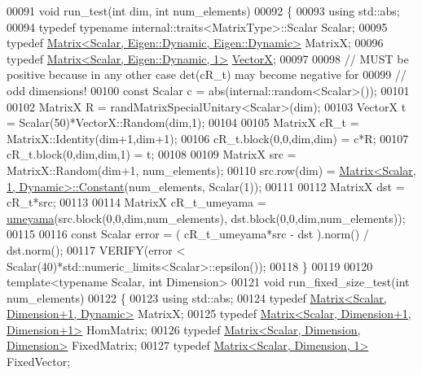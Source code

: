 \begin{DoxyCode}
00091 \textcolor{keywordtype}{void} run\_test(\textcolor{keywordtype}{int} dim, \textcolor{keywordtype}{int} num\_elements)
00092 \{
00093   \textcolor{keyword}{using} std::abs;
00094   \textcolor{keyword}{typedef} \textcolor{keyword}{typename} internal::traits<MatrixType>::Scalar Scalar;
00095   \textcolor{keyword}{typedef} \hyperlink{group___core___module_class_eigen_1_1_matrix}{Matrix<Scalar, Eigen::Dynamic, Eigen::Dynamic>} 
      MatrixX;
00096   \textcolor{keyword}{typedef} \hyperlink{group___core___module_class_eigen_1_1_matrix}{Matrix<Scalar, Eigen::Dynamic, 1>} 
      \hyperlink{group___core___module}{VectorX};
00097 
00098   \textcolor{comment}{// MUST be positive because in any other case det(cR\_t) may become negative for}
00099   \textcolor{comment}{// odd dimensions!}
00100   \textcolor{keyword}{const} Scalar c = abs(internal::random<Scalar>());
00101 
00102   MatrixX R = randMatrixSpecialUnitary<Scalar>(dim);
00103   VectorX t = Scalar(50)*VectorX::Random(dim,1);
00104 
00105   MatrixX cR\_t = MatrixX::Identity(dim+1,dim+1);
00106   cR\_t.block(0,0,dim,dim) = c*R;
00107   cR\_t.block(0,dim,dim,1) = t;
00108 
00109   MatrixX src = MatrixX::Random(dim+1, num\_elements);
00110   src.row(dim) = \hyperlink{group___core___module_class_eigen_1_1_matrix}{Matrix<Scalar, 1, Dynamic>::Constant}(num\_elements, 
      Scalar(1));
00111 
00112   MatrixX dst = cR\_t*src;
00113 
00114   MatrixX cR\_t\_umeyama = \hyperlink{group___geometry___module_ga033d6550c1fc82e232f2b4c380c19a54}{umeyama}(src.block(0,0,dim,num\_elements), dst.block(0,0,dim,num\_elements));
00115 
00116   \textcolor{keyword}{const} Scalar error = ( cR\_t\_umeyama*src - dst ).norm() / dst.norm();
00117   VERIFY(error < Scalar(40)*std::numeric\_limits<Scalar>::epsilon());
00118 \}
00119 
00120 \textcolor{keyword}{template}<\textcolor{keyword}{typename} Scalar, \textcolor{keywordtype}{int} Dimension>
00121 \textcolor{keywordtype}{void} run\_fixed\_size\_test(\textcolor{keywordtype}{int} num\_elements)
00122 \{
00123   \textcolor{keyword}{using} std::abs;
00124   \textcolor{keyword}{typedef} \hyperlink{group___core___module_class_eigen_1_1_matrix}{Matrix<Scalar, Dimension+1, Dynamic>} MatrixX;
00125   \textcolor{keyword}{typedef} \hyperlink{group___core___module_class_eigen_1_1_matrix}{Matrix<Scalar, Dimension+1, Dimension+1>} HomMatrix;
00126   \textcolor{keyword}{typedef} \hyperlink{group___core___module_class_eigen_1_1_matrix}{Matrix<Scalar, Dimension, Dimension>} FixedMatrix;
00127   \textcolor{keyword}{typedef} \hyperlink{group___core___module_class_eigen_1_1_matrix}{Matrix<Scalar, Dimension, 1>} FixedVector;

\end{DoxyCode}
